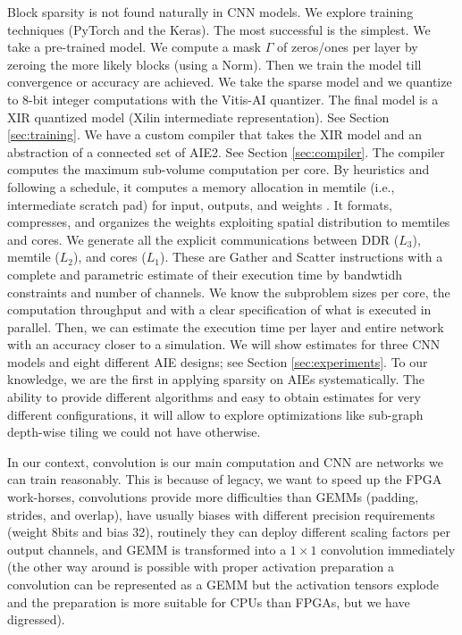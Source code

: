 \documentclass{IEEEtran}
\begin{document}
Block sparsity is not found naturally in CNN models. We explore
training techniques (PyTorch and the Keras).  The most successful is
the simplest. We take a pre-trained model. We compute a mask $\Gamma$
of zeros/ones per layer by zeroing the more likely blocks (using a
Norm). Then we train the model till convergence or accuracy are
achieved. We take the sparse model and we quantize to 8-bit integer
computations with the Vitis-AI quantizer. The final model is a XIR
quantized model (Xilin intermediate representation). See Section
\ref{sec:training}. We have a custom compiler that takes the XIR model
and an abstraction of a connected set of AIE2. See Section
\ref{sec:compiler}. The compiler computes the maximum sub-volume
computation per core. By heuristics and following a schedule, it
computes a memory allocation in memtile (i.e., intermediate scratch
pad) for input, outputs, and weights . It formats, compresses, and
organizes the weights exploiting spatial distribution to memtiles and
cores. We generate all the explicit communications between DDR
($L_3$), memtile ($L_2$), and cores ($L_1$). These are Gather and
Scatter instructions with a complete and parametric estimate of their
execution time by bandwtidh constraints and number of channels. We
know the subproblem sizes per core, the computation throughput and
with a clear specification of what is executed in parallel. Then, we
can estimate the execution time per layer and entire network with an
accuracy closer to a simulation.  We will show estimates for three CNN
models and eight different AIE designs; see Section
\ref{sec:experiments}. To our knowledge, we are the first in applying
sparsity on AIEs systematically. The ability to provide different
algorithms and easy to obtain estimates for very different
configurations, it will allow to explore optimizations like sub-graph
depth-wise tiling we could not have otherwise.

In our context, convolution is our main computation and CNN are
networks we can train reasonably. This is because of legacy, we want
to speed up the FPGA work-horses, convolutions provide more
difficulties than GEMMs (padding, strides, and overlap), have usually
biases with different precision requirements (weight 8bits and bias
32), routinely they can deploy different scaling factors per output
channels, and GEMM is transformed into a $1 \times 1$ convolution
immediately (the other way around is possible with proper activation
preparation a convolution can be represented as a GEMM but the
activation tensors explode and the preparation is more suitable for
CPUs than FPGAs, but we have digressed).
\end{document}
